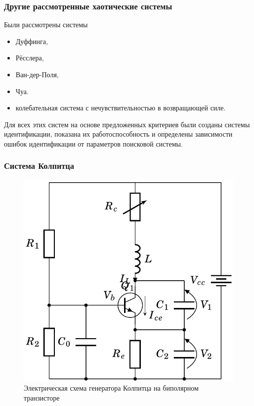 \documentclass[10pt,utf8]{beamer}
\newlength\TW
\begin{document}
\begin{frame}
  \frametitle{Другие рассмотренные хаотические системы}

  Были рассмотрены системы
  \begin{itemize}

    \item
      Дуффинга,

    \item
      Рёсслера,

    \item
      Ван-дер-Поля,

    \item
      Чуа.

    \item
    колебательная система с нечувствительностью в возвращающей силе.

  \end{itemize}


  Для всех этих систем на основе предложенных критериев были
  созданы системы идентификации, показана их работоспособность
  и определены зависимости ошибок идентификации от параметров поисковой системы.


\end{frame}





\begin{frame}
  \frametitle{Система Колпитца}

  \begin{figure}[htb!]
  \begin{center}
    \includegraphics[width=50\TW]{p/colp/colp_schem.png}
  \end{center}
  \caption{Электрическая схема генератора Колпитца на биполярном транзисторе}
  \label{atu:f:colp_schem}
  \end{figure}

\end{frame}
\end{document}

